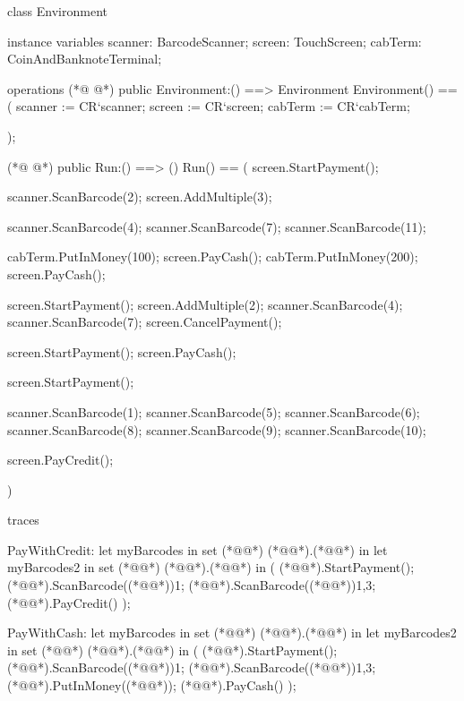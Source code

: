 \begin{vdmpp}
class Environment

instance variables
  scanner: BarcodeScanner;
  screen: TouchScreen;
  cabTerm: CoinAndBanknoteTerminal;

operations
(*@
\label{Environment:9}
@*)
 public Environment:() ==> Environment
 Environment() == 
  (
   scanner := CR`scanner;
   screen := CR`screen;
   cabTerm := CR`cabTerm;
   
  );
  
(*@
\label{Run:18}
@*)
 public Run:() ==> ()
 Run() ==
 (
  screen.StartPayment();
  
  scanner.ScanBarcode(2);
  screen.AddMultiple(3);
  
  scanner.ScanBarcode(4);
  scanner.ScanBarcode(7);
  scanner.ScanBarcode(11);
  
  cabTerm.PutInMoney(100);
  screen.PayCash();
  cabTerm.PutInMoney(200);
  screen.PayCash();
  
  screen.StartPayment();
  screen.AddMultiple(2);
  scanner.ScanBarcode(4);
  scanner.ScanBarcode(7);
  screen.CancelPayment();
  
  screen.StartPayment();
  screen.PayCash();
  
  
  screen.StartPayment();
  
  scanner.ScanBarcode(1);
  scanner.ScanBarcode(5);
  scanner.ScanBarcode(6);
  scanner.ScanBarcode(8);
  scanner.ScanBarcode(9);
  scanner.ScanBarcode(10);
  
  screen.PayCredit();
 
 )

traces

PayWithCredit: 
 let myBarcodes in set (*@@*) (*@@*).(*@@*)
 in
  let myBarcodes2 in set (*@@*) (*@@*).(*@@*)
  in
  (
   (*@@*).StartPayment();
   (*@@*).ScanBarcode((*@@*)){1};
   (*@@*).ScanBarcode((*@@*)){1,3};
   (*@@*).PayCredit()
  );


PayWithCash: 
 let myBarcodes in set (*@@*) (*@@*).(*@@*)
 in
  let myBarcodes2 in set (*@@*) (*@@*).(*@@*)
  in
  (
   (*@@*).StartPayment();
   (*@@*).ScanBarcode((*@@*)){1};
   (*@@*).ScanBarcode((*@@*)){1,3};
   (*@@*).PutInMoney((*@@*));
   (*@@*).PayCash()
  );
       

\end{vdmpp}

